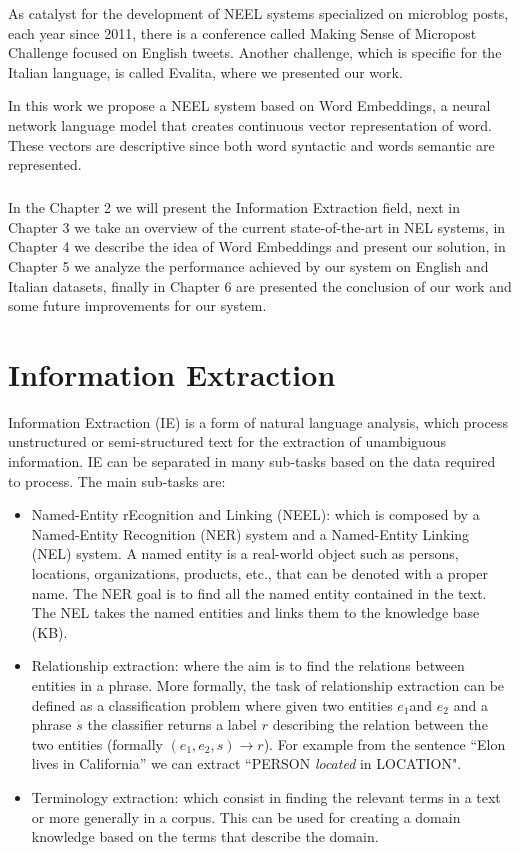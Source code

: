 As catalyst for the development of NEEL systems specialized on microblog posts, each year since 2011, there is a conference called Making Sense of Micropost Challenge focused on English tweets. Another challenge, which is specific for the Italian language, is called Evalita, where we presented our work.

In this work we propose a NEEL system based on Word Embeddings, a neural network language model that creates continuous vector representation of word. These vectors are  descriptive since both word syntactic and words semantic are represented. 

\paragraph{}
In the Chapter 2 we will present the Information Extraction field, next in Chapter 3 we take an overview of the current state-of-the-art in NEL systems, in Chapter 4 we describe the idea of Word Embeddings and present our solution, in Chapter 5 we analyze the performance achieved by our system on English and Italian datasets, finally in Chapter 6 are presented the conclusion of our work and some future improvements for our system.

\chapter{Information Extraction}
Information Extraction (IE) is a form of natural language analysis, which process unstructured or semi-structured text for the extraction of unambiguous information. IE can be separated in many sub-tasks based on the data required to process. The main sub-tasks are:

\begin{itemize}[itemsep = 0.1em]
\item Named-Entity rEcognition and Linking (NEEL): which is composed by a Named-Entity Recognition (NER) system and a Named-Entity Linking (NEL) system. A named entity is a real-world object such as persons, locations, organizations, products, etc., that can be denoted with a proper name. The NER goal is to find all the named entity contained in the text. The NEL takes the named entities and links them to the knowledge base (KB).

\item Relationship extraction: where the aim is to find the relations between entities in a phrase. More formally, the task of relationship extraction can be defined as a classification problem where given two entities \(e_1\)and \(e_2\) and a phrase \(s\) the classifier returns a label \(r\) describing the relation between the two entities (formally \((e_1, e_2, s)\rightarrow r\)). For example from the sentence ``Elon lives in California'' we can extract ``PERSON \textit{located} in LOCATION".

\item Terminology extraction: which consist in finding the relevant terms in a text or more generally in a corpus. This can be used for creating a domain knowledge based on the terms that describe the domain.
\end{itemize}

